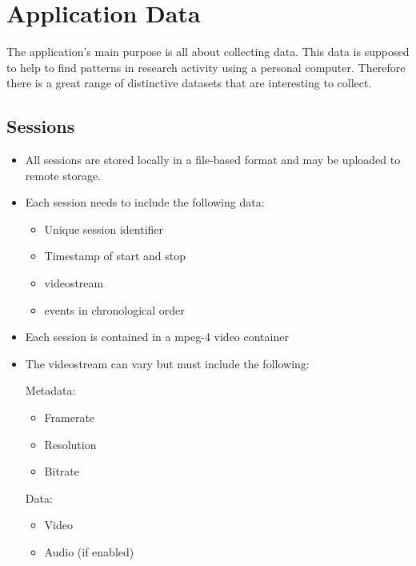\chapter{Application Data}
\label{ch:data}

\newcommand{\internaldspec}[1]
{
    \item[D\arabic{counterD}\phantomsection\label{D\arabic{counterD}}]{#1}
}
\newcommand{\dspec}[2][]{\ifthenelse{\equal{#1}{}}{\setcounter{counterD}{\intcalcAdd{\value{counterD}}{\intcalcSub{10}{\intcalcMod{\value{counterD}}{10}}}}}{\setcounter{counterD}{#1}}\internaldspec{#2}}
\newcommand{\dsubspec}[1]{\stepcounter{counterD}\internaldspec{#1}}

The application's main purpose is all about collecting data. This data is supposed to help to find patterns in research activity using a personal computer. Therefore there is a great range of distinctive datasets that are interesting to collect.

\section{Sessions}
\begin{itemize}
\dspec{All \glspl{session} are stored locally in a file-based format and may be uploaded to remote storage. }

\dspec{Each session needs to include the following data:
	\begin{itemize}
	\item Unique \gls{session} identifier
	\item Timestamp of start and stop
	\item \Gls{videostream}
	\item \Glspl{event} in chronological order
	\end{itemize}
}

\dspec{Each \gls{session} is contained in a mpeg-4 video container}

\dspec{The \gls{videostream} can vary but must include the following:

	Metadata:
	\begin{itemize}
	\item Framerate
	\item Resolution
	\item Bitrate
	\end{itemize}

	Data:
	\begin{itemize}
	\item Video
	\item Audio (if enabled)
	\end{itemize}
}
\end{itemize}

